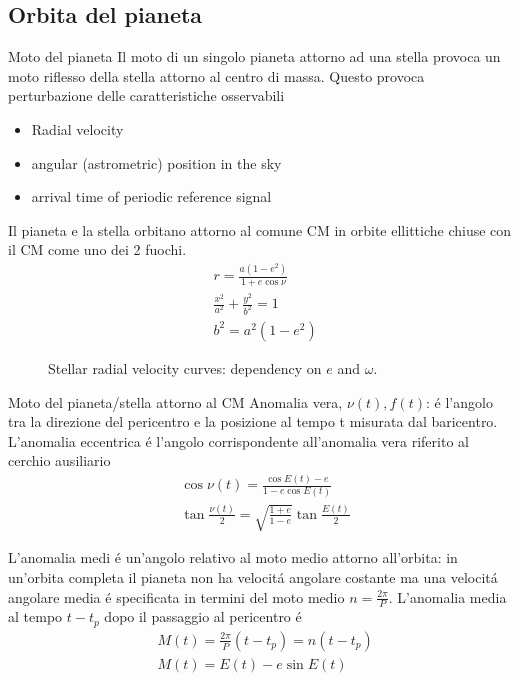 \subsection{Orbita del pianeta}

\begin{frame}{Moto del pianeta}
Il moto di un singolo pianeta attorno ad una stella provoca un moto riflesso della stella attorno al centro di massa. Questo provoca perturbazione delle caratteristiche osservabili
\begin{itemize}
    \item Radial velocity
    \item angular (astrometric) position in the sky
    \item arrival time of periodic reference signal 
\end{itemize}
Il pianeta e la stella orbitano attorno al comune CM in orbite ellittiche chiuse con il CM come uno dei 2 fuochi.
\begin{align*}
&r=\frac{a(1-e^2)}{1+e\cos{\nu}}\\
&\frac{x^2}{a^2}+\frac{y^2}{b^2}=1\\
&b^2=a^2(1-e^2)
\end{align*}
\begin{figure}[!ht]
\centering
\caption{Stellar radial velocity curves: dependency on $e$ and $\omega$.}
\end{figure}
\end{frame}

\begin{wordonframe}{Moto del pianeta/stella attorno al CM}
Anomalia vera, $\nu(t), f(t)$: \'e l'angolo tra la direzione del pericentro e la posizione al tempo t misurata dal baricentro. L'anomalia eccentrica \'e l'angolo corrispondente all'anomalia vera riferito al cerchio ausiliario
\begin{align*}
&\cos{\nu(t)}=\frac{\cos{E(t)}-e}{1-e\cos{E(t)}}\\
&\tan{\frac{\nu(t)}{2}}=\sqrt{\frac{1+e}{1-e}}\tan{\frac{E(t)}{2}}
\end{align*}

L'anomalia medi \'e un'angolo relativo al moto medio attorno all'orbita: in un'orbita completa il pianeta non ha velocit\'a angolare costante ma una velocit\'a angolare media \'e specificata in termini del moto medio $n=\frac{2\pi}{P}$. L'anomalia media al tempo $t-t_p$ dopo il passaggio al pericentro \'e
\begin{align*}
&M(t)=\frac{2\pi}{P}(t-t_p)=n(t-t_p)\\
&M(t)=E(t)-e\sin{E(t)}
\end{align*}
\end{wordonframe}

